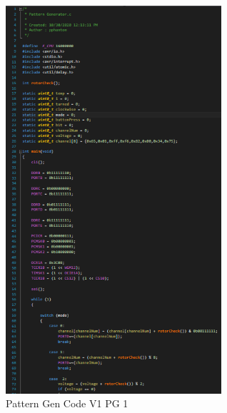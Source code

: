 \documentclass[12pt]{article}
\begin{document}
        \begin{figure}[htp]
            \centering
            \includegraphics[width=8cm]{Pattern Gen Code V1 PG 1.png}
            \caption{Pattern Gen Code V1 PG 1}
        \end{figure}
\end{document}
